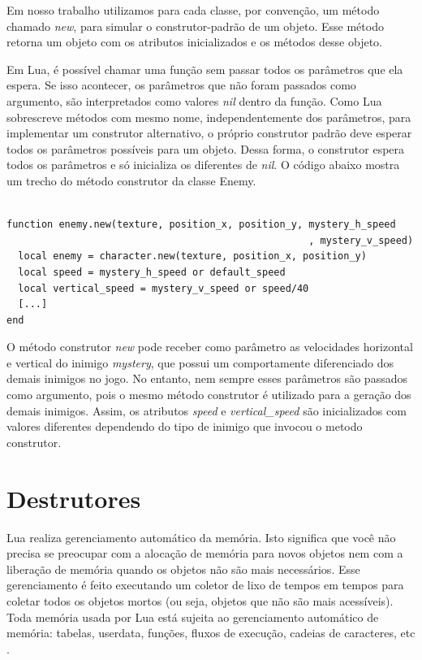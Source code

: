 \documentclass[rel_mlp]{iiufrgs}
\begin{document}
Em nosso trabalho utilizamos para cada classe, por convenção, um método chamado \textit{new}, para simular o construtor-padrão de um objeto. Esse método retorna um objeto com os atributos inicializados e os métodos desse objeto.

Em Lua, é possível chamar uma função sem passar todos os parâmetros que ela espera. Se isso acontecer, os parâmetros que não foram passados como argumento, são interpretados como valores \textit{nil} dentro da função. Como Lua sobrescreve métodos com mesmo nome, independentemente dos parâmetros, para implementar um construtor alternativo, o próprio construtor padrão deve esperar todos os parâmetros possíveis para um objeto. Dessa forma, o construtor espera todos os parâmetros e só inicializa os diferentes de \textit{nil}. O código abaixo mostra um trecho do método construtor da classe Enemy.

\clearpage

\begin{lstlisting}

function enemy.new(texture, position_x, position_y, mystery_h_speed
													, mystery_v_speed)
  local enemy = character.new(texture, position_x, position_y)
  local speed = mystery_h_speed or default_speed
  local vertical_speed = mystery_v_speed or speed/40
  [...]
end

\end{lstlisting}

O método construtor \textit{new} pode receber como parâmetro as velocidades horizontal e vertical do inimigo \textit{mystery}, que possui um comportamente diferenciado dos demais inimigos no jogo. No entanto, nem sempre esses parâmetros são passados como argumento, pois o mesmo método construtor é utilizado para a geração dos demais inimigos. Assim, os atributos \textit{speed} e \textit{vertical\_speed} são inicializados com valores diferentes dependendo do tipo de inimigo que invocou o metodo construtor.


\section{Destrutores}

Lua realiza gerenciamento automático da memória. Isto significa que você não precisa se preocupar com a alocação de memória para novos objetos nem com a liberação de memória quando os objetos não são mais necessários. Esse gerenciamento é feito executando um coletor de lixo de tempos em tempos para coletar todos os objetos mortos (ou seja, objetos que não são mais acessíveis). Toda memória usada por Lua está sujeita ao gerenciamento automático de memória: tabelas, userdata, funções, fluxos de execução, cadeias de caracteres, etc \cite{ManualLua}.
\end{document}
